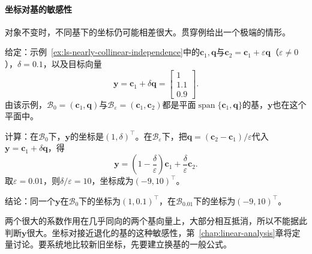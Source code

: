 \paragraph{坐标对基的敏感性}
对象不变时，不同基下的坐标仍可能相差很大。贯穿例给出一个极端的情形。
\begin{example}[近共线基下的大坐标]
\label{ex:ls-coordinate-instability}
给定：示例~\ref{ex:ls-nearly-collinear-independence}中的$\bm c_1,\bm q$与$\bm c_2=\bm c_1+\varepsilon\bm q$（$\varepsilon\neq0$），$\delta=0.1$，以及目标向量
\begin{equation}
 \bm y=\bm c_1+\delta\bm q=\begin{bmatrix}1\\1.1\\0.9\end{bmatrix}.
 \label{eq:linear-algebra-nearly-collinear-target}
\end{equation}
由该示例，$\mathcal B_0=(\bm c_1,\bm q)$与$\mathcal B_\varepsilon=(\bm c_1,\bm c_2)$都是平面$\operatorname{span}\{\bm c_1,\bm q\}$的基，$\bm y$也在这个平面中。

计算：在$\mathcal B_0$下，$\bm y$的坐标是$(1,\delta)^{\top}$。在$\mathcal B_\varepsilon$下，把$\bm q=(\bm c_2-\bm c_1)/\varepsilon$代入$\bm y=\bm c_1+\delta\bm q$，得
\begin{equation}
 \bm y=\left(1-\frac{\delta}{\varepsilon}\right)\bm c_1
       +\frac{\delta}{\varepsilon}\bm c_2.
 \label{eq:linear-algebra-coordinate-instability}
\end{equation}
取$\varepsilon=0.01$，则$\delta/\varepsilon=10$，坐标成为$(-9,10)^{\top}$。

结论：同一个$\bm y$在$\mathcal B_0$下的坐标为$(1,0.1)^\top$，在$\mathcal B_{0.01}$下的坐标为$(-9,10)^\top$。
\end{example}
两个很大的系数作用在几乎同向的两个基向量上，大部分相互抵消，所以不能据此判断$\bm y$很大。坐标对接近退化的基的这种敏感性，第~\ref{chap:linear-analysis}章将定量讨论。要系统地比较新旧坐标，先要建立换基的一般公式。

